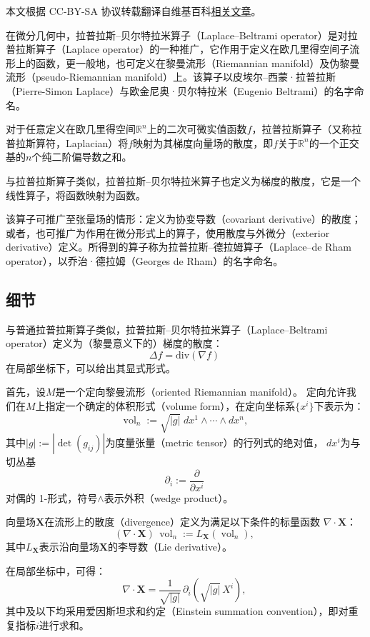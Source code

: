 
本文根据 CC-BY-SA 协议转载翻译自维基百科\href{https://en.wikipedia.org/wiki/Laplace\%E2\%80\%93Beltrami_operator}{相关文章}。

在微分几何中，拉普拉斯–贝尔特拉米算子（Laplace–Beltrami operator）是对拉普拉斯算子（Laplace operator）的一种推广，它作用于定义在欧几里得空间子流形上的函数，更一般地，也可定义在黎曼流形（Riemannian manifold）及伪黎曼流形（pseudo-Riemannian manifold）上。该算子以皮埃尔–西蒙·拉普拉斯（Pierre-Simon Laplace）与欧金尼奥·贝尔特拉米（Eugenio Beltrami）的名字命名。

对于任意定义在欧几里得空间$\mathbb{R}^{n}$上的二次可微实值函数$f$，拉普拉斯算子（又称拉普拉斯算符，Laplacian）将$f$映射为其梯度向量场的散度，即$f$关于$\mathbb{R}^{n}$的一个正交基的$n$个纯二阶偏导数之和。

与拉普拉斯算子类似，拉普拉斯–贝尔特拉米算子也定义为梯度的散度，它是一个线性算子，将函数映射为函数。

该算子可推广至张量场的情形：定义为协变导数（covariant derivative）的散度；或者，也可推广为作用在微分形式上的算子，使用散度与外微分（exterior derivative）定义。所得到的算子称为拉普拉斯–德拉姆算子（Laplace–de Rham operator），以乔治·德拉姆（Georges de Rham）的名字命名。
\subsection{细节}
与普通拉普拉斯算子类似，拉普拉斯–贝尔特拉米算子（Laplace–Beltrami operator）定义为（黎曼意义下的）梯度的散度：
\[
\Delta f = \mathrm{div}(\nabla f)~
\]
在局部坐标下，可以给出其显式形式。

首先，设$M$是一个定向黎曼流形（oriented Riemannian manifold）。
定向允许我们在$M$上指定一个确定的体积形式（volume form），在定向坐标系$\{x^{i}\}$下表示为：
\[
\operatorname{vol}_{n}
:= \sqrt{|g|}\; dx^{1} \wedge \cdots \wedge dx^{n},~
\]
其中$|g| := |\det(g_{ij})|$为度量张量（metric tensor）的行列式的绝对值，
$dx^{i}$为与切丛基
\[
\partial_{i} := \frac{\partial}{\partial x^{i}}~
\]
对偶的 1-形式，符号$\wedge$表示外积（wedge product）。

向量场$\mathbf{X}$在流形上的散度（divergence）定义为满足以下条件的标量函数 $\nabla \cdot \mathbf{X}$：
\[
(\nabla \cdot \mathbf{X}) \, \operatorname{vol}_{n}
:= L_{\mathbf{X}} (\operatorname{vol}_{n}),~
\]
其中$L_{\mathbf{X}}$表示沿向量场$\mathbf{X}$的李导数（Lie derivative）。

在局部坐标中，可得：
\[
\nabla \cdot \mathbf{X}
= \frac{1}{\sqrt{|g|}} \, \partial_{i}
  \left( \sqrt{|g|} \, X^{i} \right),~
\]
其中及以下均采用爱因斯坦求和约定（Einstein summation convention），即对重复指标$i$进行求和。

